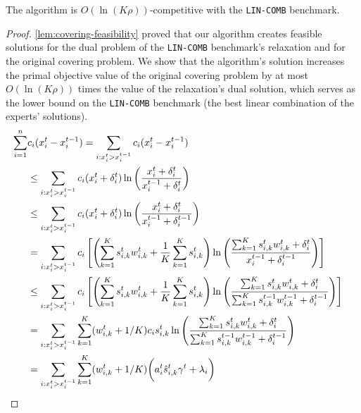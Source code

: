 \clearpage

\begin{theorem} \label{covering-theorem}
The algorithm is $O(\ln(K \rho))$-competitive with the \texttt{LIN-COMB} benchmark.
\end{theorem}
%
\begin{proof} \cref{lem:covering-feasibility} proved that our algorithm creates feasible solutions for the dual problem of the \texttt{LIN-COMB} benchmark's relaxation and for the original covering problem. We show that the algorithm's solution increases the primal objective value of the original covering problem by at most $O(\ln(K \rho))$ times the value of the relaxation's dual solution, which serves as the lower bound on the \texttt{LIN-COMB} benchmark (the best linear combination of the experts' solutions).
\begin{align}
	 \sum_{i=1}^{n} &c_{i} (x_{i}^{t} - x_{i}^{t-1})
		= \sum_{i: x_{i}^{t} > x_{i}^{t-1}} c_{i}(x_{i}^{t} - x_{i}^{t-1}) &&  \notag \\
		&\leq \sum_{i: x_{i}^{t} > x_{i}^{t-1}} c_{i}(x_{i}^{t} + \delta_{i}^{t}) \ln \left(\frac{x_{i}^{t} + \delta_{i}^{t}}{x_{i}^{t-1} + \delta_{i}^{t}}\right) \\
		&\leq \sum_{i: x_{i}^{t} > x_{i}^{t-1}} c_{i} (x_{i}^{t} + \delta_{i}^{t}) \ln \left(\frac{x_{i}^{t} + \delta_{i}^{t}}{x_{i}^{t-1} + \delta_{i}^{t-1}}\right) \\
		&= \sum_{i: x_{i}^{t} > x_{i}^{t-1}} c_{i} \left[ \left(\sum_{k=1}^{K}  s_{i,k}^{t} w_{i,k}^{t} + \frac{1}{K} \sum_{k=1}^{K} s_{i,k}^{t} \right)
			\ln \left(\frac{ \sum_{k=1}^{K}  s_{i,k}^{t} w_{i,k}^{t} + \delta_{i}^{t}}{x_{i}^{t-1} + \delta_{i}^{t-1}}  \right) \right] \\
%
&\leq \sum_{i: x_{i}^{t} > x_{i}^{t-1}} c_{i} \left[ \left(\sum_{k=1}^{K}  s_{i,k}^{t} w_{i,k}^{t} + \frac{1}{K} \sum_{k=1}^{K} s_{i,k}^{t} \right)
			\ln \left(\frac{ \sum_{k=1}^{K}  s_{i,k}^{t} w_{i,k}^{t} + \delta_{i}^{t}}{\sum_{k=1}^{K}  s_{i,k}^{t-1} w_{i,k}^{t-1} + \delta_{i}^{t-1}}  \right) \right]\\
%
	&= \sum_{i: x_{i}^{t} > x_{i}^{t-1}} \sum_{k=1}^{K} (w_{i,k}^{t} + 1/K) c_{i} s_{i,k}^{t}
				\ln \left(\frac{ \sum_{k=1}^{K} s_{i,k}^{t} w_{i,k}^{t}  + \delta_{i}^{t}}{\sum_{k=1}^{K}  s_{i,k}^{t-1} w_{i,k}^{t-1}  + \delta_{i}^{t-1}}  \right) \notag \\
%
%
&=  \sum_{i: x_{i}^{t} > x_{i}^{t-1}} \sum_{k=1}^{K} (w_{i,k}^{t} + 1/K) \biggl( a_{i}^{t} \hat{s}_{i,k}^{t} \gamma^t + \lambda_{i} \biggr) \\

\end{align}
\end{proof}
